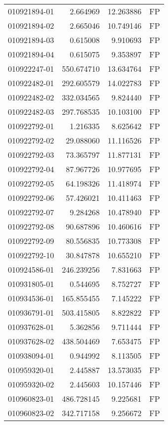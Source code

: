 \begin{tabular}{lrrl}
010921894-01 &    2.664969 &    12.263886 &   FP \\
010921894-02 &    2.665046 &    10.749146 &   FP \\
010921894-03 &    0.615008 &     9.910693 &   FP \\
010921894-04 &    0.615075 &     9.353897 &   FP \\
010922247-01 &  550.674710 &    13.634764 &   FP \\
010922482-01 &  292.605579 &    14.022783 &   FP \\
010922482-02 &  332.034565 &     9.824440 &   FP \\
010922482-03 &  297.768535 &    10.103100 &   FP \\
010922792-01 &    1.216335 &     8.625642 &   FP \\
010922792-02 &   29.088060 &    11.116526 &   FP \\
010922792-03 &   73.365797 &    11.877131 &   FP \\
010922792-04 &   87.967726 &    10.977695 &   FP \\
010922792-05 &   64.198326 &    11.418974 &   FP \\
010922792-06 &   57.426021 &    10.411463 &   FP \\
010922792-07 &    9.284268 &    10.478940 &   FP \\
010922792-08 &   90.687896 &    10.460616 &   FP \\
010922792-09 &   80.556835 &    10.773308 &   FP \\
010922792-10 &   30.847878 &    10.655210 &   FP \\
010924586-01 &  246.239256 &     7.831663 &   FP \\
010931805-01 &    0.544695 &     8.752727 &   FP \\
010934536-01 &  165.855455 &     7.145222 &   FP \\
010936791-01 &  503.415805 &     8.822822 &   FP \\
010937628-01 &    5.362856 &     9.711444 &   FP \\
010937628-02 &  438.504469 &     7.653475 &   FP \\
010938094-01 &    0.944992 &     8.113505 &   FP \\
010959320-01 &    2.445887 &    13.573035 &   FP \\
010959320-02 &    2.445603 &    10.157446 &   FP \\
010960823-01 &  486.728145 &     9.225681 &   FP \\
010960823-02 &  342.717158 &     9.256672 &   FP \\

\end{tabular}
